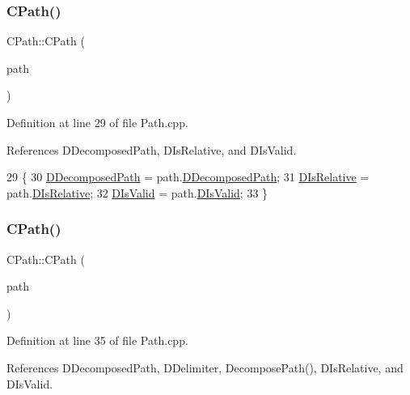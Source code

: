\subsubsection{\texorpdfstring{C\+Path()}{CPath()}\hspace{0.1cm}{\footnotesize\ttfamily [2/3]}}
{\footnotesize\ttfamily C\+Path\+::\+C\+Path (\begin{DoxyParamCaption}\item[{const \hyperlink{classCPath}{C\+Path} \&}]{path }\end{DoxyParamCaption})}



Definition at line 29 of file Path.\+cpp.



References D\+Decomposed\+Path, D\+Is\+Relative, and D\+Is\+Valid.


\begin{DoxyCode}
29                              \{
30     \hyperlink{classCPath_a03ed25209a01e633c107a0c877fc61f8}{DDecomposedPath} = path.\hyperlink{classCPath_a03ed25209a01e633c107a0c877fc61f8}{DDecomposedPath};
31     \hyperlink{classCPath_af705ff149bb2281c67afb84fff550eb9}{DIsRelative} = path.\hyperlink{classCPath_af705ff149bb2281c67afb84fff550eb9}{DIsRelative};
32     \hyperlink{classCPath_a992aca27a1cba1c3bae3d04438821192}{DIsValid} = path.\hyperlink{classCPath_a992aca27a1cba1c3bae3d04438821192}{DIsValid};
33 \}
\end{DoxyCode}
\hypertarget{classCPath_aceb476f21440713272cf0ef38f2619c6}{}\label{classCPath_aceb476f21440713272cf0ef38f2619c6} 
\subsubsection{\texorpdfstring{C\+Path()}{CPath()}\hspace{0.1cm}{\footnotesize\ttfamily [3/3]}}
{\footnotesize\ttfamily C\+Path\+::\+C\+Path (\begin{DoxyParamCaption}\item[{const std\+::string \&}]{path }\end{DoxyParamCaption})}



Definition at line 35 of file Path.\+cpp.



References D\+Decomposed\+Path, D\+Delimiter, Decompose\+Path(), D\+Is\+Relative, and D\+Is\+Valid.



